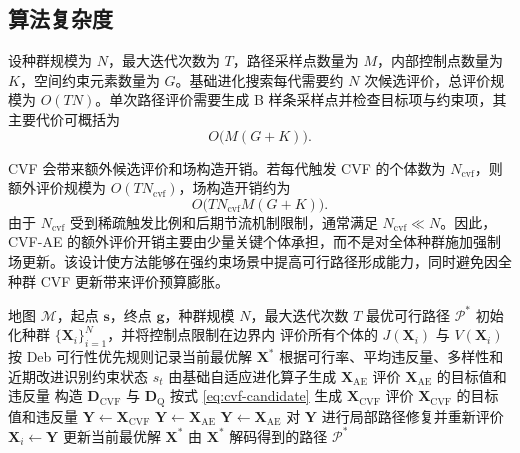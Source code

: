 \subsection{算法复杂度}

设种群规模为 $N$，最大迭代次数为 $T$，路径采样点数量为 $M$，内部控制点数量为 $K$，空间约束元素数量为 $G$。基础进化搜索每代需要约 $N$ 次候选评价，总评价规模为 $O(TN)$。单次路径评价需要生成 B 样条采样点并检查目标项与约束项，其主要代价可概括为
\begin{equation}
    O\big(M(G+K)\big).
\end{equation}

CVF 会带来额外候选评价和场构造开销。若每代触发 CVF 的个体数为 $N_{\mathrm{cvf}}$，则额外评价规模为 $O(TN_{\mathrm{cvf}})$，场构造开销约为
\begin{equation}
    O\big(TN_{\mathrm{cvf}}M(G+K)\big).
\end{equation}
由于 $N_{\mathrm{cvf}}$ 受到稀疏触发比例和后期节流机制限制，通常满足 $N_{\mathrm{cvf}}\ll N$。因此，CVF-AE 的额外评价开销主要由少量关键个体承担，而不是对全体种群施加强制场更新。该设计使方法能够在强约束场景中提高可行路径形成能力，同时避免因全种群 CVF 更新带来评价预算膨胀。

\begin{algorithm}[htbp]
\caption{CVF-AE 的完整算法流程}
\label{alg:cvf-ae}
\begin{algorithmic}[1]
\Require 地图 $\mathcal{M}$，起点 $\mathbf{s}$，终点 $\mathbf{g}$，种群规模 $N$，最大迭代次数 $T$
\Ensure 最优可行路径 $\mathcal{P}^*$
\State 初始化种群 $\{\mathbf{X}_i\}_{i=1}^{N}$，并将控制点限制在边界内
\State 评价所有个体的 $J(\mathbf{X}_i)$ 与 $V(\mathbf{X}_i)$
\State 按 Deb 可行性优先规则记录当前最优解 $\mathbf{X}^*$
    \State 根据可行率、平均违反量、多样性和近期改进识别约束状态 $s_t$
        \State 由基础自适应进化算子生成 $\mathbf{X}_{\mathrm{AE}}$
        \State 评价 $\mathbf{X}_{\mathrm{AE}}$ 的目标值和违反量
            \State 构造 $\mathbf{D}_{\mathrm{CVF}}$ 与 $\mathbf{D}_{\mathrm{Q}}$
            \State 按式 \eqref{eq:cvf-candidate} 生成 $\mathbf{X}_{\mathrm{CVF}}$
            \State 评价 $\mathbf{X}_{\mathrm{CVF}}$ 的目标值和违反量
                \State $\mathbf{Y}\gets \mathbf{X}_{\mathrm{CVF}}$
            \Else
                \State $\mathbf{Y}\gets \mathbf{X}_{\mathrm{AE}}$
            \EndIf
        \Else
            \State $\mathbf{Y}\gets \mathbf{X}_{\mathrm{AE}}$
        \EndIf
            \State 对 $\mathbf{Y}$ 进行局部路径修复并重新评价
        \EndIf
            \State $\mathbf{X}_i\gets \mathbf{Y}$
        \EndIf
        \State 更新当前最优解 $\mathbf{X}^*$
    \EndFor
\EndFor
\State \Return 由 $\mathbf{X}^*$ 解码得到的路径 $\mathcal{P}^*$
\end{algorithmic}
\end{algorithm}

